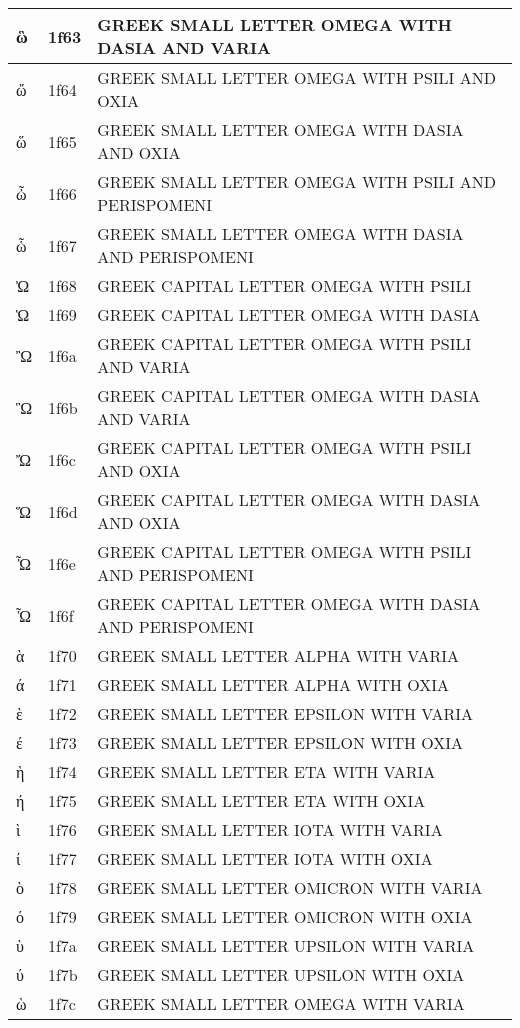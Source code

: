 \documentclass[12pt,letterpaper,openany]{book}
\begin{document}
\begin{center}
\begin{supertabular}{|m{0.25in}|m{0.5in}|m{4in}|}
ὣ & 1f63 & GREEK SMALL LETTER OMEGA WITH DASIA AND VARIA\\\hline
ὤ & 1f64 & GREEK SMALL LETTER OMEGA WITH PSILI AND OXIA\\\hline
ὥ & 1f65 & GREEK SMALL LETTER OMEGA WITH DASIA AND OXIA\\\hline
ὦ & 1f66 & GREEK SMALL LETTER OMEGA WITH PSILI AND PERISPOMENI\\\hline
ὧ & 1f67 & GREEK SMALL LETTER OMEGA WITH DASIA AND PERISPOMENI\\\hline
Ὠ & 1f68 & GREEK CAPITAL LETTER OMEGA WITH PSILI\\\hline
Ὡ & 1f69 & GREEK CAPITAL LETTER OMEGA WITH DASIA\\\hline
Ὢ & 1f6a & GREEK CAPITAL LETTER OMEGA WITH PSILI AND VARIA\\\hline
Ὣ & 1f6b & GREEK CAPITAL LETTER OMEGA WITH DASIA AND VARIA\\\hline
Ὤ & 1f6c & GREEK CAPITAL LETTER OMEGA WITH PSILI AND OXIA\\\hline
Ὥ & 1f6d & GREEK CAPITAL LETTER OMEGA WITH DASIA AND OXIA\\\hline
Ὦ & 1f6e & GREEK CAPITAL LETTER OMEGA WITH PSILI AND PERISPOMENI\\\hline
Ὧ & 1f6f & GREEK CAPITAL LETTER OMEGA WITH DASIA AND PERISPOMENI\\\hline
ὰ & 1f70 & GREEK SMALL LETTER ALPHA WITH VARIA\\\hline
ά & 1f71 & GREEK SMALL LETTER ALPHA WITH OXIA\\\hline
ὲ & 1f72 & GREEK SMALL LETTER EPSILON WITH VARIA\\\hline
έ & 1f73 & GREEK SMALL LETTER EPSILON WITH OXIA\\\hline
ὴ & 1f74 & GREEK SMALL LETTER ETA WITH VARIA\\\hline
ή & 1f75 & GREEK SMALL LETTER ETA WITH OXIA\\\hline
ὶ & 1f76 & GREEK SMALL LETTER IOTA WITH VARIA\\\hline
ί & 1f77 & GREEK SMALL LETTER IOTA WITH OXIA\\\hline
ὸ & 1f78 & GREEK SMALL LETTER OMICRON WITH VARIA\\\hline
ό & 1f79 & GREEK SMALL LETTER OMICRON WITH OXIA\\\hline
ὺ & 1f7a & GREEK SMALL LETTER UPSILON WITH VARIA\\\hline
ύ & 1f7b & GREEK SMALL LETTER UPSILON WITH OXIA\\\hline
ὼ & 1f7c & GREEK SMALL LETTER OMEGA WITH VARIA\\\hline

\end{supertabular}
\end{center}
\end{document}
